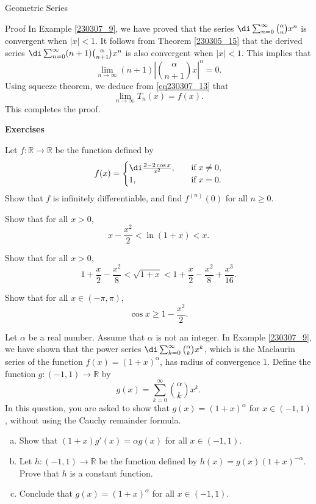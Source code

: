 \begin{example}[label=230305_16]{Geometric Series}
\begin{example}[label=230304_9]{}
\begin{example}{}
\begin{example}{}
\begin{myproof}{Proof}
In Example \ref{230307_9}, we have proved that the series $\di\sum_{n=0}^{\infty}\binom{\alpha}{n}x^n$ is convergent when $|x|<1$. It follows from Theorem \ref{230305_15} that the derived series $\di\sum_{n=0}^{\infty}(n+1)\binom{\alpha}{n+1}x^n$ is also convergent when $|x|<1$. This implies that 
\[\lim_{n\to\infty}(n+1)\left|\binom{\alpha}{n+1}x\right|^n=0.\]
Using squeeze theorem, we deduce from \eqref{eq230307_13} that
\[\lim_{n\to\infty}T_n(x)=f(x).\] This completes the proof.
\end{myproof}


\vp
\noindent
{\bf \large Exercises  \thesection}
\setcounter{myquestion}{1}
\begin{question}{\themyquestion}
Let $f:\mathbb{R}\to\mathbb{R}$ be the function defined by
\[f(x)=\begin{cases} \di\frac{2-2\cos x}{x^2},\quad &\text{if}\;x\neq 0,\\1,\quad & \text{if} \;x=0.\end{cases}\]Show that  $f$ is infinitely differentiable, and find $f^{(n)}(0) $ for all $n\geq 0$.
\end{question}


\atc
\begin{question}{\themyquestion}
Show that for all $x>0$,
\[x-\frac{x^2}{2}<\ln (1+x)<x.\]
\end{question}
 
\atc
\begin{question}{\themyquestion}
Show that for all $x>0$,
\[1+\frac{x}{2}-\frac{x^2}{8}<\sqrt{1+x}<1+\frac{x}{2}-\frac{x^2}{8}+\frac{x^3}{16}.\]
\end{question}

\atc
\begin{question}{\themyquestion}
Show that for all $x\in (-\pi, \pi)$,
\[\cos x\geq 1-\frac{x^2}{2}.\]
\end{question}

\atc
\begin{question}{\themyquestion}
Let $\alpha$ be a real number. Assume that $\alpha$ is not an integer. In Example \ref{230307_9}, we have shown that the power series $\di\sum_{k=0}^{\infty}\binom{\alpha}{k}x^k$,
which is the Maclaurin series of the function $f(x)=(1+x)^{\alpha}$, has radius of convergence 1. Define the function 
$g:(-1,1)\to\mathbb{R}$ by
\[g(x)=\sum_{k=0}^{\infty}\binom{\alpha}{k}x^k.\]
In this question, you are asked to show that $g(x)=(1+x)^{\alpha}$ for $x\in (-1,1)$, without using the Cauchy remainder formula.
\begin{enumerate}[(a)]\item
Show that $(1+x)g'(x)=\alpha g(x)$ for all $x\in (-1,1)$.
\item Let $h:(-1,1)\to\mathbb{R}$ be the function defined by $h(x)=g(x)(1+x)^{-\alpha}$. Prove that $h$ is a constant function.
\item Conclude that $g(x)=(1+x)^{\alpha}$ for all $x\in (-1,1)$.
\end{enumerate}
\end{question}


\end{example}
\end{example}
\end{example}
\end{example}
